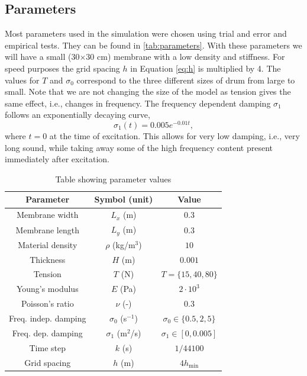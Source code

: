 \documentclass{vgtc}
\begin{document}
\subsection{Parameters}
Most parameters used in the simulation were chosen using trial and error and empirical tests. They can be found in \autoref{tab:parameters}. With these parameters we will have a small (30$\times$30 cm) membrane with a low density and stiffness. For speed purposes the grid spacing $h$ in Equation \eqref{eq:h} is multiplied by 4. The values for $T$ and $\sigma_0$ correspond to the three different sizes of drum from large to small. Note that we are not changing the size of the model as tension gives the same effect, i.e., changes in frequency. The frequency dependent damping  $\sigma_1$ follows an exponentially decaying curve, 
\begin{equation}
    \sigma_1(t) = 0.005e^{-0.01 t},
\end{equation}
where $t=0$ at the time of excitation. This allows for very low damping, i.e., very long sound, while taking away some of the high frequency content present immediately after excitation.
\begin{table}[h]
\caption{Table showing parameter values}\label{tab:parameters}
\centering
\begin{tabular}{|c|c|c|}
    \hline
    Parameter & Symbol (unit) & Value \\
    \hline
    Membrane width & $L_x$ (m) & $0.3$\\
    Membrane length & $L_y$ (m) & $0.3$ \\
    Material density & $\rho$ (kg/m$^3$)& $10$ \\
    Thickness & $H$ (m) & $0.001$ \\
    Tension & $T$ (N) & $T = \{15, 40, 80\}$ \\
    Young's modulus & $E$ (Pa)& $2\cdot 10^3$ \\
    Poisson's ratio & $\nu$ (-)& $0.3$ \\
    Freq. indep. damping & $\sigma_0$ (s$^{-1}$) & $\sigma_0 \in \{0.5, 2, 5\}$\\
    Freq. dep. damping & $\sigma_1$ (m$^2$/s) & $\sigma_1 \in [0, 0.005]$\\
    Time step & $k$ (s) & $1/44100$\\
    Grid spacing & $h$ (m) & $4h_\text{min}$\\
    \hline
\end{tabular}
\end{table}\vspace{1em}
\end{document}
